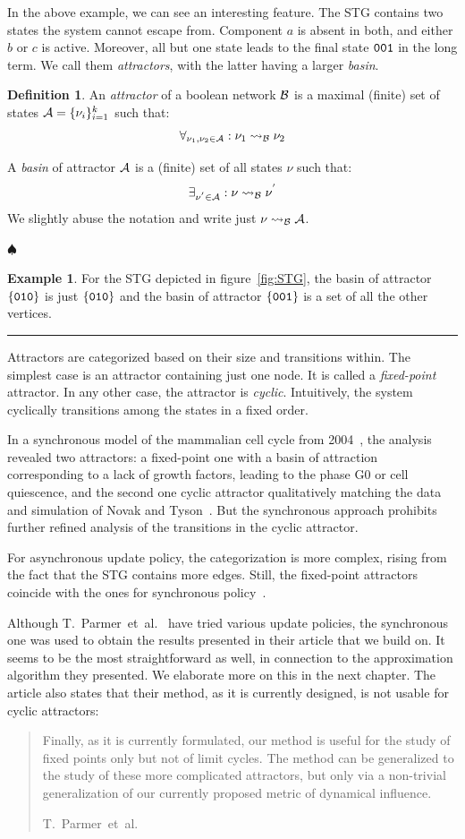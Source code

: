 \documentclass[
	digital, oneside, nosansbold, nocolorbold, nolot, nolof
]{fithesis4}
\theoremstyle{definition}
\newtheorem{definition}{Definition}
\theoremstyle{definition}
\newtheorem{example}{Example}
\newenvironment{ldefinition}
    {\begin{definition}}
	{\par\hspace{\stretch{1}}$\spadesuit$\hspace{\stretch{1}}
     \par\end{definition}}
\newenvironment{lexample}
    {\begin{example}}
    {\par\hspace{\stretch{1}}\rule{0.2\textwidth}{0.01ex}\hspace{\stretch{1}}
     \par\end{example}}
\DeclarePairedDelimiter{\set}{\{}{\}}
\begin{document}
In the above example, we can see an interesting feature. The STG contains two
states the system cannot escape from. Component $a$ is absent in both, and
either $b$ or $c$ is active. Moreover, all but one state leads to the final
state $\mathtt{001}$ in the long term. We call them \emph{attractors}, with the
latter having a larger \emph{basin}.

\begin{ldefinition}
An \emph{attractor} of a boolean network $\mathcal{B}$ is a maximal (finite) set
of states $\attr{A} = \set{\nu_i}_{i=1}^k$ such that:
\[ \forall_{\nu_1, \nu_2 \in \mathcal{A}} : \nu_1 \rightsquigarrow_{\mathcal{B}} \nu_2 \]

A \emph{basin} of attractor $\mathcal{A}$ is a (finite) set of all states $\nu$
such that:
\[ \exists_{\nu^{'} \in \mathcal{A}} : \nu \rightsquigarrow_{\mathcal{B}} \nu^{'} \]
We slightly abuse the notation and write just $\nu \rightsquigarrow_{\mathcal{B}} \mathcal{A}$.
\end{ldefinition}

\begin{lexample}
For the STG depicted in figure~\ref{fig:STG}, the basin of attractor
$\set{\state{010}}$ is just $\set{\state{010}}$ and the basin of attractor
$\set{\state{001}}$ is a set of all the other vertices.
\end{lexample}


Attractors are categorized based on their size and transitions within. The
simplest case is an attractor containing just one node. It is called a
\emph{fixed-point} attractor. In any other case, the attractor is
\emph{cyclic}. Intuitively, the system cyclically transitions among the states
in a fixed order.

In a synchronous model of the mammalian cell cycle from 2004~\cite{mammalian},
the analysis revealed two attractors: a fixed-point one with a basin of
attraction corresponding to a lack of growth factors, leading to the phase G0
or cell quiescence, and the second one cyclic attractor qualitatively matching
the data and simulation of Novak and Tyson~\cite{novak}. But the synchronous
approach prohibits further refined analysis of the transitions in the cyclic
attractor.

For asynchronous update policy, the categorization is more complex, rising from the fact that the STG contains more edges. Still, the fixed-point attractors coincide with the ones for synchronous policy~\cite{attractors}.

Although T.~Parmer~et~al.~\cite{infl_max_BN} have tried various update
policies, the synchronous one was used to obtain the results presented in their
article that we build on.  It seems to be the most straightforward as well, in
connection to the approximation algorithm they presented. We elaborate more on
this in the next chapter. The article also states that their method, as it is
currently designed, is not usable for cyclic attractors:
\blockquote[T.~Parmer~et~al.~\cite{infl_max_BN}]{Finally, as it is currently
formulated, our method is useful for the study of fixed points only but not
of limit cycles. The method can be generalized to the study of these more
complicated attractors, but only via a non-trivial generalization of our
currently proposed metric of dynamical influence.}
\end{document}
